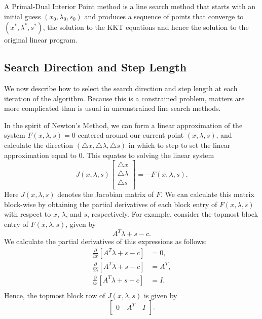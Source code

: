 A Primal-Dual Interior Point method is a line search method that starts with an initial guess $(x_0, \lambda_0, s_0)$
and produces a sequence of points that converge to $(x^*, \lambda^*, s^*)$, the solution to the KKT equations and hence
the solution to the original linear program.

\subsection*{Search Direction and Step Length}
We now describe how to select the search direction and step length at each iteration of the algorithm. Because this is
a constrained problem, matters are more complicated than is usual in unconstrained line search methods.

In the spirit of
Newton's Method, we can form a linear approximation of the system $F(x,\lambda,s) = 0$ centered around our current
point $(x, \lambda, s)$, and
calculate the direction $(\triangle x, \triangle \lambda, \triangle s)$ in which to step to set the linear approximation
equal to 0. This equates to solving the linear system
\[
J(x,\lambda,s)
\begin{bmatrix}
\triangle x\\
\triangle \lambda\\
\triangle s\\
\end{bmatrix}
= - F(x,\lambda,s).
\]
Here $J(x,\lambda,s)$ denotes the Jacobian matrix of $F$. We can calculate this matrix block-wise by obtaining the
partial derivatives of each block entry of $F(x,\lambda, s)$ with respect to $x$, $\lambda$, and $s$, respectively.
For example, consider the topmost block entry of $F(x,\lambda,s)$, given by
\[
A^T\lambda + s - c.
\]
We calculate the partial derivatives of this expressions as follows:
\begin{align*}
\frac{\partial}{\partial x}[A^T\lambda + s - c] &= 0,\\
\frac{\partial}{\partial \lambda}[A^T\lambda + s - c] &= A^T,\\
\frac{\partial}{\partial s}[A^T\lambda + s - c] &= I.\\
\end{align*}
Hence, the topmost block row of $J(x,\lambda,s)$ is given by
\[
\begin{bmatrix}
0 \quad A^T \quad I\\
\end{bmatrix}.
\]

